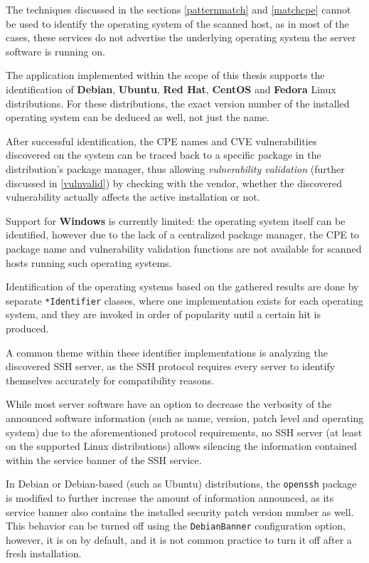 \documentclass[a4paper,12pt]{article}
\begin{document}
	The techniques discussed in the sections \ref{patternmatch} and \ref{matchcpe} cannot be used to identify the operating system of the scanned host, as in most of the cases, these services do not advertise the underlying operating system the server software is running on.
	
	The application implemented within the scope of this thesis supports the identification of \textbf{Debian}, \textbf{Ubuntu}, \textbf{Red Hat}, \textbf{CentOS} and \textbf{Fedora} Linux distributions. For these distributions, the exact version number of the installed operating system can be deduced as well, not just the name.
	
	After successful identification, the CPE names and CVE vulnerabilities discovered on the system can be traced back to a specific package in the distribution's package manager, thus allowing \textit{vulnerability validation} (further discussed in \ref{vulnvalid}) by checking with the vendor, whether the discovered vulnerability actually affects the active installation or not.
	
	Support for \textbf{Windows} is currently limited: the operating system itself can be identified, however due to the lack of a centralized package manager, the CPE to package name and vulnerability validation functions are not available for scanned hosts running such operating systems.
	
	Identification of the operating systems based on the gathered results are done by separate \texttt{*Identifier} classes, where one implementation exists for each operating system, and they are invoked in order of popularity until a certain hit is produced.
	
	A common theme within these identifier implementations is analyzing the discovered SSH server, as the SSH protocol requires every server to identify themselves accurately for compatibility reasons.
	
	While most server software have an option to decrease the verbosity of the announced software information (such as name, version, patch level and operating system) due to the aforementioned protocol requirements, no SSH server (at least on the supported Linux distributions) allows silencing the information contained within the service banner of the SSH service.
	
	In Debian or Debian-based (such as Ubuntu) distributions, the \texttt{openssh} package is modified to further increase the amount of information announced, as its service banner also contains the installed security patch version number as well. This behavior can be turned off using the \texttt{DebianBanner} configuration option, however, it is on by default, and it is not common practice to turn it off after a fresh installation.
	
\end{document}
